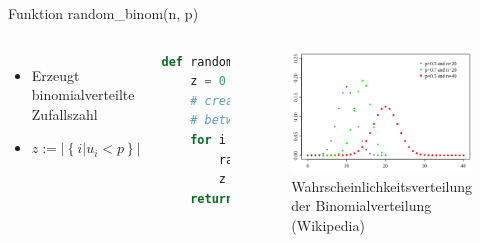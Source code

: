  \begin{frame}[fragile]{Funktion random\_binom(n, p)}
  \begin{columns}
    \begin{itemize}
  	\item Erzeugt binomialverteilte Zufallszahl
  	\item $ z := |\left\{ i|u_i<p \right\}|$
  \end{itemize}
  \begin{lstlisting}[language=python]
def random_binom(n, p):
    z = 0
    # create n random numbers
    # between [0,1]:
    for i in range(n):
        rand = random.random()
        z += 1 if rand < p else 0
    return z
\end{lstlisting}
\logopythonbottom
    	\begin{figure}[h!]
    	\includegraphics[scale=0.5]{lib_random_binom_wahrscheinlichkeitsverteilung.png}
  			\caption{Wahrscheinlichkeitsverteilung der Binomialverteilung \tiny{(Wikipedia)}}
		\end{figure}
  \end{columns}
\end{frame}	